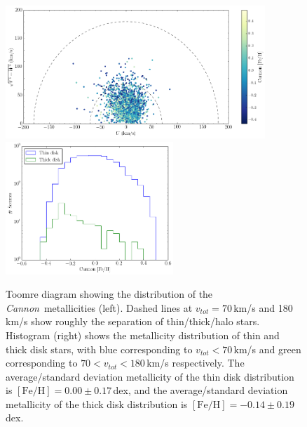 \documentclass[twocolumn]{aastex62}
\newcommand{\cannon}{\textsl{Cannon}}
\newcommand{\feh}{[{\mathrm{Fe}/\mathrm{H}}]}
\begin{document}
\begin{figure}
\begin{center}
	\includegraphics[height=5cm]{toomre.png}
	\includegraphics[height=5cm]{met_hist.png}
	\caption{Toomre diagram showing the distribution of the \cannon\ metallicities (left). Dashed lines at $v_{tot}=70$\,km/s and 180\,km/s show roughly the separation of thin/thick/halo stars. Histogram (right) shows the metallicity distribution of thin and thick disk stars, with blue corresponding to $v_{tot}<70$\,km/s and green corresponding to $70<v_{tot}<180$\,km/s respectively. The average/standard deviation metallicity of the thin disk distribution is $\feh=0.00\pm0.17\,$dex, and the average/standard deviation metallicity of the thick disk distribution is $\feh=-0.14\pm0.19\,$dex.}
	\label{fig:toomre}
\end{center}
\end{figure}
\end{document}
